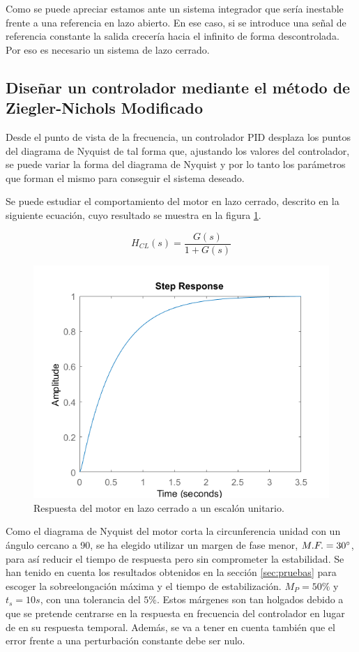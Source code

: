 \documentclass[a4paper]{article}
\begin{document}
Como se puede apreciar estamos ante un sistema integrador que sería inestable frente a una referencia en lazo abierto. En ese caso, si se introduce una señal de referencia constante la salida crecería hacia el infinito de forma descontrolada. Por eso es necesario un sistema de lazo cerrado.

\subsection{Diseñar un controlador mediante el método de Ziegler-Nichols Modificado}
Desde el punto de vista de la frecuencia, un controlador PID desplaza los puntos del diagrama de Nyquist de tal forma que, ajustando los valores del controlador, se puede variar la forma del diagrama de Nyquist y por lo tanto los parámetros que forman el mismo para conseguir el sistema deseado.

Se puede estudiar el comportamiento del motor en lazo cerrado, descrito en la siguiente ecuación, cuyo resultado se muestra en la figura \ref{fig:cl}.

\begin{equation}
H_{CL}(s)=\frac{G(s)}{1 + G(s)}
\end{equation}

\begin{center}
	\begin{figure}
		\centering
		\includegraphics[width=12cm]{lazo_cerrado}
		\caption{Respuesta del motor en lazo cerrado a un escalón unitario.}
		\label{fig:cl}
	\end{figure}
\end{center}

Como el diagrama de Nyquist del motor corta la circunferencia unidad con un ángulo cercano a 90\degree, se ha elegido utilizar un margen de fase menor, $M.F. = 30\degree$, para así reducir el tiempo de respuesta pero sin comprometer la estabilidad. Se han tenido en cuenta los resultados obtenidos en la sección \ref{sec:pruebas} para escoger la sobreelongación máxima y el tiempo de estabilización. $M_P=50\%$ y $t_s=10 s$, con una tolerancia del $5\%$. Estos márgenes son tan holgados debido a que se pretende centrarse en la respuesta en frecuencia del controlador en lugar de en su respuesta temporal. Además, se va a tener en cuenta también que el error frente a una perturbación constante debe ser nulo.
\end{document}
